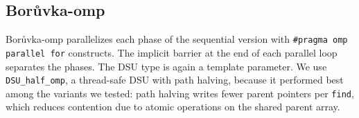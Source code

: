 \documentclass[11pt,a4paper]{article}
\begin{document}

\subsection*{Bor\r{u}vka-omp}
Bor\r{u}vka-omp parallelizes each phase of the sequential version with \texttt{\#pragma omp parallel for} constructs. The implicit barrier at the end of each parallel loop separates the phases. The DSU type is again a template parameter. We use \texttt{DSU\_half\_omp}, a thread-safe DSU with path halving, because it performed best among the variants we tested: path halving writes fewer parent pointers per \texttt{find}, which reduces contention due to atomic operations on the shared parent array.
\end{document}
